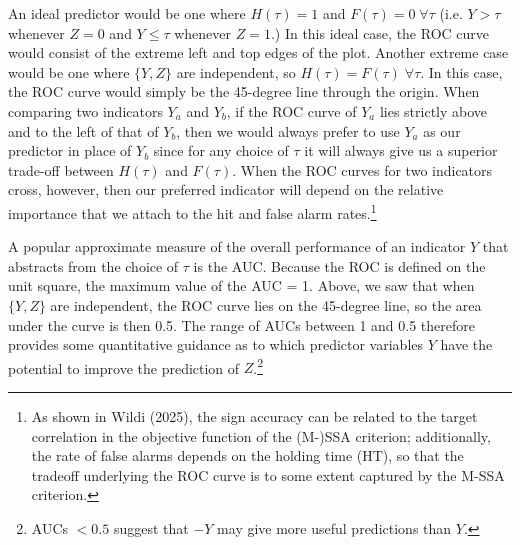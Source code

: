 \documentclass[11pt,a4paper]{article}
\begin{document}
An ideal predictor would be one where $H(\tau) = 1$ and $F(\tau) = 0 \; \forall \tau $ (i.e. $Y > \tau$ whenever $Z=0$ and $Y \leq \tau$ whenever $Z=1$.) In this ideal case, the ROC curve would consist of the extreme left and top edges of the plot. Another extreme case would be one where $\{Y,Z\}$ are independent, so $H(\tau) = F(\tau) \; \forall \tau$. In this case, the ROC curve would simply be the 45-degree line through the origin. When comparing two indicators $Y_a$ and $Y_b$, if the ROC curve of $Y_a$ lies strictly above and to the left of that of $Y_b$, then we would always prefer to use $Y_a$ as our predictor in place of $Y_b$ since for any choice of $\tau$ it will always give us a superior trade-off between $H(\tau)$ and $F(\tau)$. When the ROC curves for two indicators cross, however, then our preferred indicator will depend on the relative importance that we attach to the hit and false alarm rates.\footnote{As shown in Wildi (2025), the sign accuracy can be related to the target correlation in the objective function of the (M-)SSA criterion; additionally, the rate of false alarms depends on the holding time (HT), so that the tradeoff underlying the ROC curve is to some extent captured by the M-SSA criterion.} 

A popular approximate measure of the overall performance of an indicator $Y$ that abstracts from the choice of $\tau$ is the AUC. Because the ROC is defined on the unit square, the maximum value of the AUC = 1. Above, we saw that when $\{Y,Z\}$ are independent, the ROC curve lies on the 45-degree line, so the area under the curve is then 0.5. The range of AUCs between 1 and 0.5 therefore provides some quantitative guidance as to which predictor variables $Y$ have the potential to improve the prediction of $Z$.\footnote{AUCs $< 0.5$ suggest that $-Y$ may give more useful predictions than $Y$.}

\end{document}
